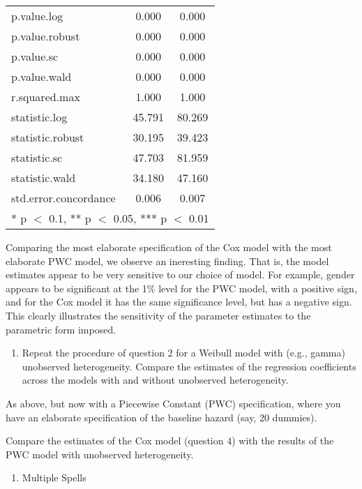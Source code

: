 \documentclass[
]{article}
\providecommand{\tightlist}{%
  \setlength{\itemsep}{0pt}\setlength{\parskip}{0pt}}
\begin{document}
\begin{table}[!h]
\begin{tabular}[t]{lcc}
p.value.log & \num{0.000} & \num{0.000}\\
p.value.robust & \num{0.000} & \num{0.000}\\
p.value.sc & \num{0.000} & \num{0.000}\\
p.value.wald & \num{0.000} & \num{0.000}\\
r.squared.max & \num{1.000} & \num{1.000}\\
statistic.log & \num{45.791} & \num{80.269}\\
statistic.robust & \num{30.195} & \num{39.423}\\
statistic.sc & \num{47.703} & \num{81.959}\\
statistic.wald & \num{34.180} & \num{47.160}\\
std.error.concordance & \num{0.006} & \num{0.007}\\
\bottomrule
\multicolumn{3}{l}{\rule{0pt}{1em}* p $<$ 0.1, ** p $<$ 0.05, *** p $<$ 0.01}\\
\end{tabular}
\end{table}

Comparing the most elaborate specification of the Cox model with the
most elaborate PWC model, we observe an ineresting finding. That is, the
model estimates appear to be very sensitive to our choice of model. For
example, gender appears to be significant at the 1\% level for the PWC
model, with a positive sign, and for the Cox model it has the same
significance level, but has a negative sign. This clearly illustrates
the sensitivity of the parameter estimates to the parametric form
imposed.

\begin{enumerate}
\def\labelenumi{\arabic{enumi}.}
\setcounter{enumi}{4}
\tightlist
\item
  Repeat the procedure of question 2 for a Weibull model with (e.g.,
  gamma) unobserved heterogeneity. Compare the estimates of the
  regression coefficients across the models with and without unobserved
  heterogeneity.
\end{enumerate}

As above, but now with a Piecewise Constant (PWC) specification, where
you have an elaborate specification of the baseline hazard (say, 20
dummies).

Compare the estimates of the Cox model (question 4) with the results of
the PWC model with unobserved heterogeneity.

\begin{enumerate}
\def\labelenumi{\arabic{enumi}.}
\setcounter{enumi}{5}
\tightlist
\item
  Multiple Spells
\end{enumerate}
\end{document}

